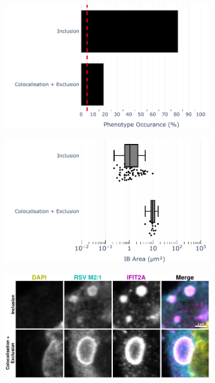\begin{figure}
    \begin{subfigure}{0.5\textwidth}
        \caption{}
        \includegraphics[width=1\linewidth]{10. Chapter 5/Figs/01. Infection/01. IFIT2A/07. bar_i2a_a549-m21.pdf} 
    \end{subfigure}
    \begin{subfigure}{0.5\textwidth}
        \caption{}
        \includegraphics[width=1\linewidth]{10. Chapter 5/Figs/01. Infection/01. IFIT2A/08. box_i2a_a549-m21.pdf}
    \end{subfigure}
    \begin{subfigure}{1\textwidth}
        \caption{}
        \includegraphics[width=1\linewidth]{10. Chapter 5/Figs/01. Infection/01. IFIT2A/09. i2a a549 hrsv m21.pdf} 

\end{subfigure}
\end{figure}

